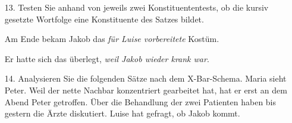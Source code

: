 \begin{frame}

\begin{itemize}
	
	\item[13.] Testen Sie anhand von jeweils zwei Konstituententests, ob die kursiv gesetzte Wortfolge eine Konstituente des Satzes bildet.
	
	\eal
	\ex Am Ende bekam Jakob das \emph{für Luise vorbereitete} Kostüm.

	
	
\medskip
	
	\ex Er hatte sich das überlegt, \emph{weil Jakob wieder krank war}.

	
	\zl
		
\end{itemize}

\end{frame}

\begin{frame}
	
	\begin{itemize}
		\item[14.] Analysieren Sie die folgenden Sätze nach dem X-Bar-Schema.
		\eal
		\ex \label{ex:XBar1}{Maria sieht Peter.}
		\ex \label{ex:XBar2}{Weil der nette Nachbar konzentriert gearbeitet hat, hat er erst an dem Abend Peter getroffen.}
		\ex \label{ex:XBar3}{Über die Behandlung der zwei Patienten haben bis gestern die Ärzte diskutiert.}
		\ex \label{ex:XBar4}{Luise hat gefragt, ob Jakob kommt.}
		\zl
		
	\end{itemize}

\end{frame}

